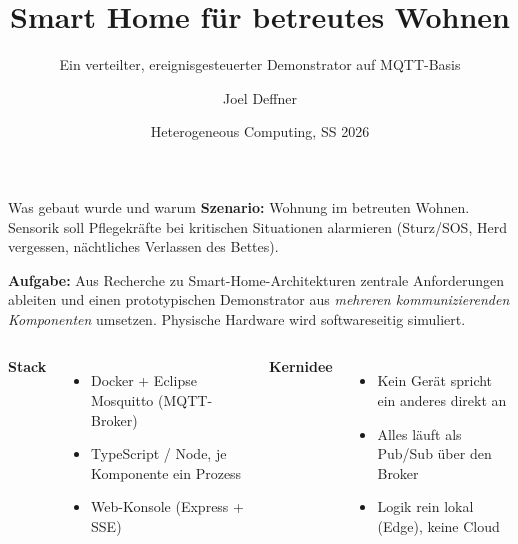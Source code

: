 \documentclass[aspectratio=169,11pt]{beamer}
\title{Smart Home f\"ur betreutes Wohnen}
\subtitle{Ein verteilter, ereignisgesteuerter Demonstrator auf MQTT-Basis}
\date{Heterogeneous Computing, SS 2026}
\author{Joel Deffner}
\begin{document}
\maketitle

\begin{frame}{Was gebaut wurde und warum}
  \textbf{Szenario:} Wohnung im betreuten Wohnen. Sensorik soll Pflegekr\"afte bei
  kritischen Situationen alarmieren (Sturz/SOS, Herd vergessen, n\"achtliches Verlassen des Bettes).

  \vspace{1.2em}
  \textbf{Aufgabe:} Aus Recherche zu Smart-Home-Architekturen zentrale Anforderungen
  ableiten und einen prototypischen Demonstrator aus \emph{mehreren kommunizierenden
  Komponenten} umsetzen. Physische Hardware wird softwareseitig simuliert.

  \vspace{1.2em}
  \begin{columns}[T]
      \textbf{Stack}
      \begin{itemize}
        \item Docker + Eclipse Mosquitto (MQTT-Broker)
        \item TypeScript / Node, je Komponente ein Prozess
        \item Web-Konsole (Express + SSE)
      \end{itemize}
      \textbf{Kernidee}
      \begin{itemize}
        \item Kein Ger\"at spricht ein anderes direkt an
        \item Alles l\"auft als Pub/Sub \"uber den Broker
        \item Logik rein lokal (Edge), keine Cloud
      \end{itemize}
  \end{columns}
\end{frame}
\end{document}
